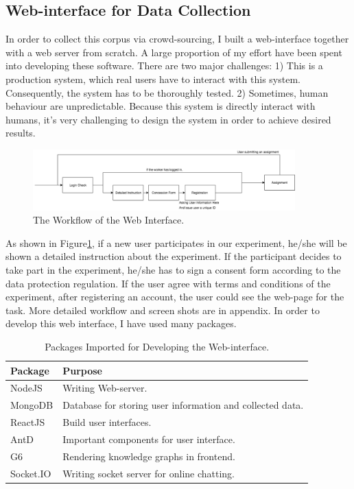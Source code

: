 \documentclass[bsc,frontabs,twoside,singlespacing,parskip,deptreport]{infthesis}     %
\begin{document}
\subsection{Web-interface for Data Collection}

In order to collect this corpus via crowd-sourcing, I built a web-interface together with a web server from scratch. A large proportion of my effort have been spent into developing these software. There are two major challenges: 1) This is a production system, which real users have to interact with this system. Consequently, the system has to be thoroughly tested. 2) Sometimes, human behaviour are unpredictable. Because this system is directly interact with humans, it's very challenging to design the system in order to achieve desired results.

\begin{figure}[h]
    \centering
    \includegraphics[width=0.9\textwidth]{process.png}
    \caption{The Workflow of the Web Interface.}
    \label{fig:web}
\end{figure}

As shown in Figure\ref{fig:web}, if a new user participates in our experiment, he/she will be shown a detailed instruction about the experiment. If the participant decides to take part in the experiment, he/she has to sign a consent form according to the data protection regulation. If the user agree with terms and conditions of the experiment, after registering an account, the user could see the web-page for the task. More detailed workflow and screen shots are in appendix. In order to develop this web interface, I have used many packages.

\begin{table}[]
\centering
\begin{tabular}{|l|l|}
\hline
Package                  & Purpose                                                   \\ \hline
NodeJS\cite{nodejs}      & Writing Web-server.                                       \\ \hline
MongoDB\cite{monodb}     & Database for storing user information and collected data. \\ \hline
ReactJS\cite{react}      & Build user interfaces.                                    \\ \hline
AntD\cite{antd}           & Important components for user interface.                  \\ \hline
G6\cite{g6}              & Rendering knowledge graphs in frontend.                   \\ \hline
Socket.IO\cite{socketio} & Writing socket server for online chatting.                \\ \hline
\end{tabular}
\caption{Packages Imported for Developing the Web-interface.}
\label{tab:packages}
\end{table}
\end{document}
